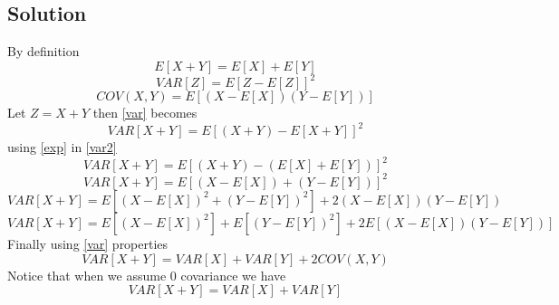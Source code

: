 \documentclass[a4 paper]{article}
\numberwithin{equation}{section}
\newcommand{\0}{\mathbf{0}}
\begin{document}
\subsection*{Solution}
$ $\\
By definition
\begin{equation}\label{exp}
E[X+Y] = E[X]+ E[Y]
\end{equation}
\begin{equation}\label{var}
VAR[Z] = E[Z - E[Z]]^2
\end{equation}
\begin{equation}\label{var}
COV(X,Y) = E[(X - E[X])(Y - E[Y])]
\end{equation}
Let $Z = X + Y$ then \ref{var} becomes
\begin{equation}\label{var2}
VAR[X+Y] = E[(X+Y)-E[X+Y]]^2
\end{equation}
using \ref{exp} in \ref{var2}
\begin{equation}
VAR[X+Y] = E[(X+Y) - (E[X]+E[Y])]^2
\end{equation}
\begin{equation}
VAR[X+Y] = E[(X-E[X]) + (Y-E[Y])]^2
\end{equation}
\begin{equation}
VAR[X+Y] = E[(X-E[X])^2 +(Y-E[Y])^2]+ 2(X-E[X])(Y-E[Y])
\end{equation}
\begin{equation}
VAR[X+Y] = E[(X-E[X])^2]+E[(Y-E[Y])^2] + 2E[(X-E[X])(Y-E[Y])]
\end{equation}
Finally using \ref{var} properties
\begin{equation}
VAR[X+Y] = VAR[X] + VAR[Y] + 2COV(X,Y)
\end{equation} 
Notice that when we assume 0 covariance we have 
\begin{equation}
VAR[X+Y] = VAR[X] + VAR[Y]
\end{equation}
%
%
%
%
\end{document}
